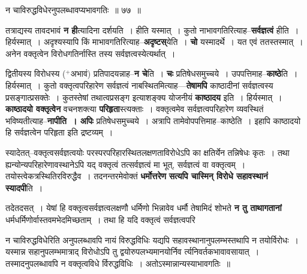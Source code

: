 \documentclass[article,12pt,a4paper]{memoir}
\newcommand{\add}[1]{($^{+}$#1)}
\begin{document}
	  \endgroup
	
	  \bigskip
	  \begingroup
	

	  \pstart न चाविरुद्धविधेरनुपलब्धावप्यभावगतिः ॥ ७७ ॥
	\pend
      
	  \endgroup
	

	  \pstart तत्राद्यस्य तावदभावं \textbf{न ही}त्यादिना दर्शयति । हीति यस्मात् । कुतो नाभावगतिरित्याह--\textbf{सर्वज्ञत्वं} हीति । हिर्यस्मात् । अदृश्यस्यापि किं माभावगतिरित्याह--\textbf{अदृष्टस्}येति । \textbf{चो} यस्मादर्थे । यत एवं ततस्तस्मात् । अनेन वक्तृत्वेन विरोधगतिर्नास्ति तस्य सर्वज्ञत्वस्येत्यर्थात् ।
	\pend
      

	  \pstart द्वितीयस्य विरोधस्य \add{अभावं} प्रतिपादयन्नाह--\textbf{न चे}ति । \textbf{चः} प्रतिषेधसमुच्चये । उपपत्तिमाह--\textbf{काष्ठे}ति । हिर्यस्मात् । कुतो वक्तृत्वपरिहारेण सर्वज्ञत्वं नाबस्थितमित्याह—\textbf{तेषामपि} काष्ठादीनां सर्वज्ञत्वस्य प्रसङ्गात्प्रसक्तेः । कुतस्तेषां तथात्वप्रसङ्ग इत्याशङ्क्य योजनीयं \textbf{काष्ठादय} इति । हिर्यस्मात् । \textbf{काष्ठादयो वक्तृत्वेन} वचनशक्त्या \textbf{परिहृता}स्त्यक्ताः । वक्तृत्वमेव सर्वज्ञत्वपरिहारेण व्यवस्थितं भविष्यतीत्याह--\textbf{नापीति । अपिः} प्रतिषेधसमुच्चये । अत्रापि तामेवोपपत्तिमाह--काष्ठेति । इहापि काष्ठादयो हि सर्वज्ञत्वेन परिहृता इति द्रष्टव्यम् ।
	\pend
      

	  \pstart स्यादेतत्--वक्तृत्वसर्वज्ञत्वयोः परस्परपरिहारस्थितलक्षणताविरोधेऽपि का क्षतिर्येन तन्निषेधः कृतः । तथा ह्यन्योन्यपरिहारेणावस्थानेऽपि यद् वक्तृत्वं तत्सर्वज्ञत्वं मा भूत्, सर्वज्ञत्वं वा वक्तृत्वम् । तयोस्त्वेकत्रस्थितिरविरुद्धैव । तदनन्तरमेवोक्तं \textbf{धर्मोत्तरेण} \leavevmode{} \textbf{सत्यपि चास्मिन् विरोधे सहावस्थानं स्यादपी}ति ।
	\pend
      

	  \pstart तदेतदसत् । येषां हि वक्तृत्वसर्वज्ञत्वलक्षणौ धर्मिणो भिन्नावेव धर्मौ तेषामिदं शोभते \textbf{न तु ताथागतानां} धर्मधर्मिणोर्वास्तवमभेदमिच्छताम् । तथा हि यदि वक्तृत्वं सर्वज्ञत्वपरि  \leavevmode{} 
	  
	न चाविरुद्धविधेरिति अनुपलब्धावपि नायं विरुद्धविधिः यद्यपि सहावस्थानानुपलम्भस्तथापि न तयोर्विरोधः । यस्मान्न सहानुपलम्भमात्राद् विरोधोऽपि तु द्वयोरुपलभ्यमानयोर्निव र्त्यनिवर्तकभावावसायात् । तस्मादनुपलब्धावपि न वक्तृत्वविधे र्विरुद्धविधिः । अतोऽस्मान्नान्यस्याभावगतिः ॥  
	  
\end{document}
